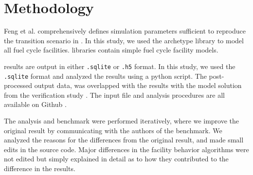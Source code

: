\section{Methodology}

Feng et al. comprehensively defines simulation parameters
sufficient to reproduce the transition scenario in \Cyclus.
In this study, we used the \Cycamore \cite{huff_fundamental_2016}
 archetype library to model
all fuel cycle facilities. \Cycamore libraries contain
simple fuel cycle facility models. 

\Cyclus results are output in either \texttt{.sqlite} or
\texttt{.h5} format. In this study, we used the
\texttt{.sqlite} format and analyzed the results
using a python script. The post-processed
output data, was overlapped with the results with the
model solution from the verification study \cite{feng_standardized_2016}.
The input file and analysis procedures are all available on Github \cite{bae_arfc/transition-scenarios:_2018}.

The analysis and benchmark were performed iteratively,
where we improve the original result by communicating
with the authors of the benchmark. 
We analyzed the reasons for the differences from the original
result, and made small edits in the source code.
Major differences in the facility behavior algorithms were not edited but
simply explained in detail as to how they contributed
to the difference in the results.
